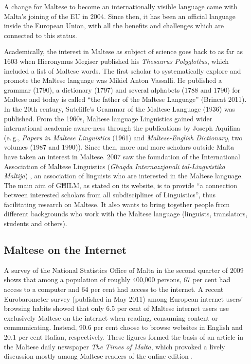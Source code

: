 \documentclass[]{../../metanetpaper}
\begin{document}
\begin{multicols}{2}
A change for Maltese to become an internationally visible language came with Malta's joining of the EU in 2004. Since then, it has been an official language inside the European Union, with all the benefits and challenges which are connected to this status.

Academically, the interest in Maltese as subject of science goes back to as far as 1603 when Hieronymus Megiser published his \emph{Thesaurus Polyglottus}, which included a list of Maltese words. The first scholar to systematically explore and promote the Maltese language was Mikiel Anton Vassalli. He published a grammar (1790), a dictionary (1797) and several alphabets (1788 and 1790) for Maltese and today is called ``the father of the Maltese Language'' (Brincat 2011). In the 20th century, Sutcliffe's Grammar of the Maltese Language (1936) was published. From the 1960s, Maltese language Linguistics gained wider international academic aware-ness through the publications by Joseph Aquilina (e.\,g., \emph{Papers in Maltese Linguistics} (1961) and \emph{Maltese-English Dictionary}, two volumes (1987 and 1990)). Since then, more and more scholars outside Malta have taken an interest in Maltese. 2007 saw the foundation of the International Association of Maltese Linguistics (\emph{Għaqda Internazzjonali tal-Lingwistika Maltija}) \cite{GHILM2} , an association of linguists who are interested in the Maltese language. The main aim of GĦILM, as stated on its website, is to provide ``a connection between interested scholars from all subdisciplines of Linguistics'', thus facilitating research on Maltese. It also wants to bring together people from different backgrounds who work with the Maltese language (linguists, translators, students and others).


\subsection{Maltese on the Internet}

A survey of the National Statistics Office of Malta in the second quarter of 2009 \cite{NSO2} shows that among a population of roughly 400,000 persons, 67 per cent had access to a computer and 64 per cent had access to the internet. A recent Eurobarometer survey (published in May 2011) \cite{Eurobarometer1} among European internet users' browsing habits showed that only 6.5 per cent of Maltese internet users use exclusively Maltese on the internet when reading, consuming content or communicating. Instead, 90.6 per cent choose to browse websites in English and 20.1 per cent Italian, respectively. These figures formed the basis of an article in the Maltese daily newspaper \emph{The Times of Malta}, which provoked a lively discussion mostly among Maltese readers of the online edition \cite{TimesOfMalta1}. 


\end{multicols}
\end{document}
